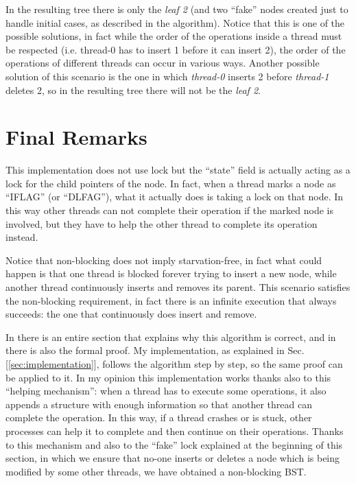 \documentclass[a4paper]{article}
\begin{document}
In the resulting tree there is only the \emph{leaf 2} (and two ``fake'' nodes created just to handle initial cases, as described in the algorithm). Notice that this is one of the possible solutions, in fact while the order of the operations inside a thread must be respected (i.e. thread-0 has to insert 1 before it can insert 2), the order of the operations of different threads can occur in various ways. Another possible solution of this scenario is the one in which \emph{thread-0} inserts 2 before \emph{thread-1} deletes 2, so in the resulting tree there will not be the \emph{leaf 2}.


\section{Final Remarks}
\label{sec:final_considerations}

This implementation does not use lock but the ``state'' field is actually acting as a lock for the child pointers of the node. In fact, when a thread marks a node as ``IFLAG'' (or ``DLFAG''), what it actually does is taking a lock on that node. In this way other threads can not complete their operation if the marked node is involved, but they have to help the other thread to complete its operation instead.

Notice that non-blocking does not imply starvation-free, in fact what could happen is that one thread is blocked forever trying to insert a new node, while another thread continuously inserts and removes its parent. This scenario satisfies the non-blocking requirement, in fact there is an infinite execution that always succeeds: the one that continuously does insert and remove.

In \cite{algorithm} there is an entire section that explains why this algorithm is correct, and in \cite{proof} there is also the formal proof. My implementation, as explained in Sec.[\ref{sec:implementation}], follows the algorithm step by step, so the same proof can be applied to it. In my opinion this implementation works thanks also to this ``helping mechanism'': when a thread has to execute some operations, it also appends a structure with enough information so that another thread can complete the operation. In this way, if a thread crashes or is stuck, other processes can help it to complete and then continue on their operations. Thanks to this mechanism and also to the ``fake'' lock explained at the beginning of this section, in which we ensure that no-one inserts or deletes a node which is being modified by some other threads, we have obtained a non-blocking \ac{BST}.
\end{document}
